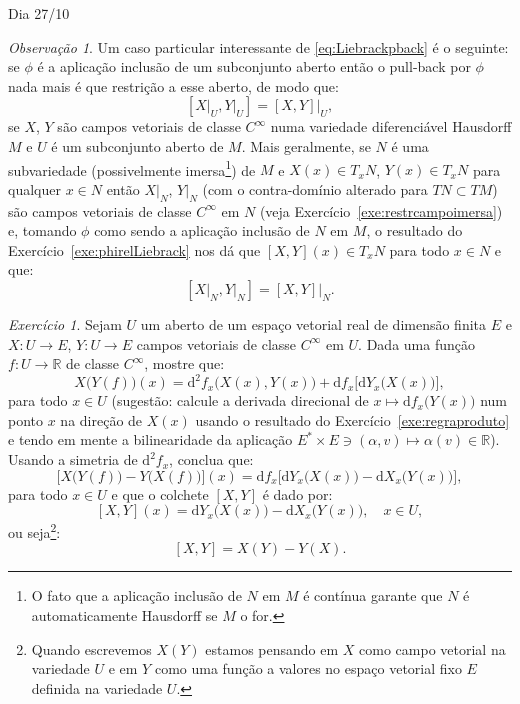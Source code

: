 \documentclass[oneside,11pt]{amsart}
\newcommand{\R}{\mathds R}
\newcommand{\dd}{\mathrm d}
\theoremstyle{remark}\newtheorem{exercise}{Exercício}[section]
\theoremstyle{plain}\newtheorem{teo}{Teorema}[section]
\theoremstyle{plain}\newtheorem{lem}[teo]{Lema}
\theoremstyle{plain}\newtheorem{prop}[teo]{Proposição}
\theoremstyle{definition}\newtheorem{defin}[teo]{Definição}
\theoremstyle{remark}\newtheorem{rem}[teo]{Observação}
\theoremstyle{definition}\newtheorem{example}[teo]{Exemplo}
\numberwithin{equation}{section}
\begin{document}
\begin{section}{Dia 27/10}
\begin{rem}
Um caso particular interessante de \eqref{eq:Liebrackpback} é o seguinte: se $\phi$ é a aplicação inclusão de um subconjunto aberto então o pull-back
por $\phi$ nada mais é que restrição a esse aberto, de modo que:
\[[X\vert_U,Y\vert_U]=[X,Y]\vert_U,\]
se $X$, $Y$ são campos vetoriais de classe $C^\infty$ numa variedade diferenciável Hausdorff $M$ e $U$ é um subconjunto aberto de $M$. Mais
geralmente, se $N$ é uma subvariedade (possivelmente imersa\footnote{%
O fato que a aplicação inclusão de $N$ em $M$ é contínua garante que $N$ é automaticamente Hausdorff se $M$ o for.})
de $M$ e $X(x)\in T_xN$, $Y(x)\in T_xN$ para qualquer $x\in N$ então $X\vert_N$,
$Y\vert_N$ (com o contra-domínio alterado para $TN\subset TM$) são campos vetoriais de classe $C^\infty$ em $N$ (veja Exercício~\ref{exe:restrcampoimersa}) e, tomando
$\phi$ como sendo a aplicação inclusão de $N$ em $M$, o resultado do Exercício~\ref{exe:phirelLiebrack} nos dá que $[X,Y](x)\in T_xN$ para todo $x\in N$ e que:
\[[X\vert_N,Y\vert_N]=[X,Y]\vert_N.\]
\end{rem}

\begin{exercise}\label{exe:LiebrackRn}
Sejam $U$ um aberto de um espaço vetorial real de dimensão finita $E$ e $X:U\to E$, $Y:U\to E$ campos vetoriais de classe $C^\infty$ em $U$.
Dada uma função $f:U\to\R$ de classe $C^\infty$, mostre que:
\[X\big(Y(f)\big)(x)=\dd^2f_x\big(X(x),Y(x)\big)+\dd f_x\big[\dd Y_x\big(X(x)\big)\big],\]
para todo $x\in U$ (sugestão: calcule a derivada direcional de $x\mapsto\dd f_x\big(Y(x)\big)$ num ponto $x$ na direção de $X(x)$ usando
o resultado do Exercício~\ref{exe:regraproduto} e tendo em mente a bilinearidade da aplicação $E^*\times E\ni(\alpha,v)\mapsto\alpha(v)\in\R$).
Usando a simetria de $\dd^2f_x$, conclua que:
\[\big[X\big(Y(f)\big)-Y\big(X(f)\big)\big](x)=\dd f_x\big[\dd Y_x\big(X(x)\big)-\dd X_x\big(Y(x)\big)\big],\]
para todo $x\in U$ e que o colchete $[X,Y]$ é dado por:
\[[X,Y](x)=\dd Y_x\big(X(x)\big)-\dd X_x\big(Y(x)\big),\quad x\in U,\]
ou seja\footnote{%
Quando escrevemos $X(Y)$ estamos pensando em $X$ como campo vetorial na variedade $U$ e em $Y$ como uma função a valores no espaço vetorial fixo $E$
definida na variedade $U$.}:
\begin{equation}\label{eq:LiebackRn}
[X,Y]=X(Y)-Y(X).
\end{equation}
\end{exercise}


\end{section}
\end{document}
